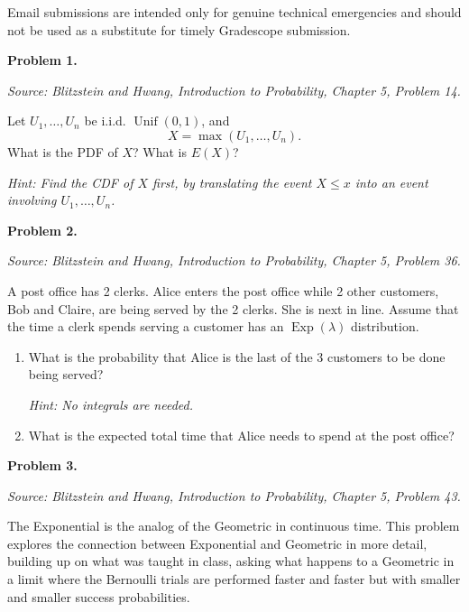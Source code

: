 \documentclass[11pt]{article}
\newcommand{\source}[2]{%
    \vspace{0.15cm}
    {\small\textit{Source: Blitzstein and Hwang, \textit{Introduction to Probability}, Chapter #1, Problem #2.}}
}
\begin{document}
Email submissions are intended only for genuine technical emergencies and should not be used as a substitute for timely Gradescope submission.

\newpage


\begin{problemheader}
\textbf{Problem 1.}
\end{problemheader}
\source{5}{14}

Let $U_1,\dots,U_n$ be i.i.d. $\operatorname{Unif}(0,1)$, and
\[
X=\max(U_1,\dots,U_n).
\]
What is the PDF of $X$? What is $E(X)$?

\emph{Hint: Find the CDF of $X$ first, by translating the event $X\le x$ into an event involving $U_1,\dots,U_n$.}
 
\newpage

 
 
 


\begin{problemheader}
\textbf{Problem 2.}
\end{problemheader}
\source{5}{36}

A post office has 2 clerks. Alice enters the post office while 2 other customers, Bob and Claire, are being served by the 2 clerks. She is next in line. Assume that the time a clerk spends serving a customer has an $\operatorname{Exp}(\lambda)$ distribution.

\begin{enumerate}[label=(\alph*), leftmargin=*]
    \item What is the probability that Alice is the last of the 3 customers to be done being served?

    \emph{Hint: No integrals are needed.}

    \item What is the expected total time that Alice needs to spend at the post office?
\end{enumerate}
 
\newpage


\begin{problemheader}
\textbf{Problem 3.}
\end{problemheader}
\source{5}{43}

The Exponential is the analog of the Geometric in continuous time. This problem explores the connection between Exponential and Geometric in more detail, building up on what was taught in class, asking what happens to a Geometric in a limit where the Bernoulli trials are performed faster and faster but with smaller and smaller success probabilities.
\end{document}
